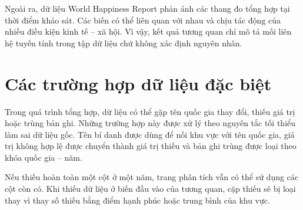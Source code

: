 Ngoài ra, dữ liệu World Happiness Report phản ánh các thang đo tổng hợp tại thời điểm khảo sát. Các biến có thể liên quan với nhau và chịu tác động của nhiều điều kiện kinh tế -- xã hội. Vì vậy, kết quả tương quan chỉ mô tả mối liên hệ tuyến tính trong tập dữ liệu chứ không xác định nguyên nhân.

\section{Các trường hợp dữ liệu đặc biệt}

Trong quá trình tổng hợp, dữ liệu có thể gặp tên quốc gia thay đổi, thiếu giá trị hoặc trùng bản ghi. Những trường hợp này được xử lý theo nguyên tắc tối thiểu làm sai dữ liệu gốc. Tên bí danh được dùng để nối khu vực với tên quốc gia, giá trị không hợp lệ được chuyển thành giá trị thiếu và bản ghi trùng được loại theo khóa quốc gia -- năm.

Nếu thiếu hoàn toàn một cột ở một năm, trang phân tích vẫn có thể sử dụng các cột còn có. Khi thiếu dữ liệu ở biến đầu vào của tương quan, cặp thiếu sẽ bị loại thay vì thay số thiếu bằng điểm hạnh phúc hoặc trung bình của khu vực.
